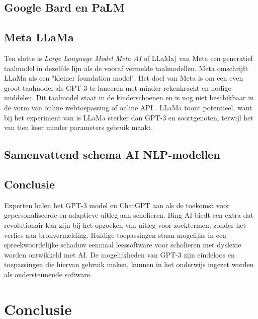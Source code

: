 \subsection{Google Bard en PaLM}




\subsection{Meta LLaMa}

Ten slotte is \textit{\textit{Large Language Model Meta AI}} of LLaMa) van Meta een generatief taalmodel in dezelfde lijn als de vooraf vermelde taalmodellen. Meta omschrijft LLaMa als een "kleiner foundation model". Het doel van Meta is om een even groot taalmodel als GPT-3 te lanceren met minder rekenkracht en nodige middelen. Dit taalmodel staat in de kinderschoenen en is nog niet beschikbaar in de vorm van online webtoepassing of online API \autocite{Hern2023, Touvron2023}. LLaMa toont potentieel, want bij het experiment van \textcite{Touvron2023} is LLaMa sterker dan GPT-3 en soortgenoten, terwijl het van tien keer minder parameters gebruik maakt.

\subsection{Samenvattend schema AI NLP-modellen}

\subsection{Conclusie}

Experten halen het GPT-3 model en ChatGPT aan als de toekomst voor gepersonaliseerde en adaptieve uitleg aan scholieren. Bing AI biedt een extra dat revolutionair kan zijn bij het opzoeken van uitleg voor zoektermen, zonder het verlies aan bronvermelding. Huidige toepassingen staan mogelijks in een spreekwoordelijke schaduw eenmaal leessoftware voor scholieren met dyslexie worden ontwikkeld met AI. De mogelijkheden van GPT-3 zijn eindeloos en toepassingen die hiervan gebruik maken, kunnen in het onderwijs ingezet worden als ondersteunende software.

\section{Conclusie}



